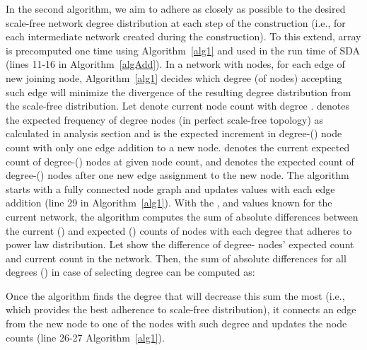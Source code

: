 \documentclass[10pt,journal,cspaper,compsoc]{IEEEtran}
\begin{document}
In the second algorithm, we aim to adhere as closely as possible to the desired scale-free network degree distribution at each step of the construction (i.e., for each intermediate network created during the construction). To this extend,  array is precomputed one time using Algorithm~\ref{alg1} and used in the run time of SDA (lines 11-16 in Algorithm~\ref{algAdd}). In a network with  nodes, for each edge of new joining node, Algorithm~\ref{alg1} decides which degree (of nodes) accepting such edge will minimize the divergence of the resulting degree distribution from the scale-free distribution. Let  denote current node count with degree .  denotes the expected frequency of degree  nodes (in perfect scale-free topology) as calculated in analysis section and  is the expected increment in degree-() node count with only one edge addition to a new node.  denotes the current expected count of degree-() nodes at given node count, and  denotes the expected count of degree-() nodes after one new edge assignment to the new node. The algorithm starts with a fully connected  node graph and updates  values with each edge addition (line 29 in Algorithm~\ref{alg1}). With the ,  and  values known for the current network, the algorithm computes the sum of absolute differences between the current () and expected () counts of nodes with each degree that adheres to power law distribution. Let  show the difference of degree- nodes' expected count and current count in the network. Then, the sum of absolute differences for all degrees () in case of selecting degree  can be computed as:
  
Once the algorithm finds the degree that will decrease this sum the most (i.e., which provides the best adherence to scale-free distribution), it connects an edge from the new node to one of the nodes with such degree and updates the node counts (line 26-27 Algorithm~\ref{alg1}).
\end{document}
